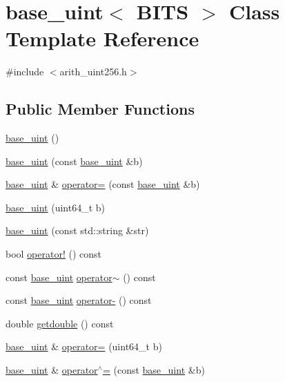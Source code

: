 \hypertarget{classbase__uint}{}\section{base\+\_\+uint$<$ B\+I\+TS $>$ Class Template Reference}
\label{classbase__uint}


{\ttfamily \#include $<$arith\+\_\+uint256.\+h$>$}

\subsection*{Public Member Functions}
\begin{DoxyCompactItemize}
\item 
\mbox{\hyperlink{classbase__uint_aafd4418923a92b58a1c360e657fa7d83}{base\+\_\+uint}} ()
\item 
\mbox{\hyperlink{classbase__uint_a5d4e4c28c82c3a12b3689860081579c1}{base\+\_\+uint}} (const \mbox{\hyperlink{classbase__uint}{base\+\_\+uint}} \&b)
\item 
\mbox{\hyperlink{classbase__uint}{base\+\_\+uint}} \& \mbox{\hyperlink{classbase__uint_a0425a3c4d342b6fc9a68b1766cee9ede}{operator=}} (const \mbox{\hyperlink{classbase__uint}{base\+\_\+uint}} \&b)
\item 
\mbox{\hyperlink{classbase__uint_a217f9750f0ca9cdeefffb7bb1f1952d6}{base\+\_\+uint}} (uint64\+\_\+t b)
\item 
\mbox{\hyperlink{classbase__uint_aa1ebaba47302da3e120879d186355736}{base\+\_\+uint}} (const std\+::string \&str)
\item 
bool \mbox{\hyperlink{classbase__uint_afbcdb1cf849d37272b4e7d4fabf1192b}{operator!}} () const
\item 
const \mbox{\hyperlink{classbase__uint}{base\+\_\+uint}} \mbox{\hyperlink{classbase__uint_a2803d039b33d5570f47ac39d797bc9ea}{operator$\sim$}} () const
\item 
const \mbox{\hyperlink{classbase__uint}{base\+\_\+uint}} \mbox{\hyperlink{classbase__uint_a3b758876b828c6faffdc2a2880122595}{operator-\/}} () const
\item 
double \mbox{\hyperlink{classbase__uint_ac989d44cd0d60e6c510722a714b817fa}{getdouble}} () const
\item 
\mbox{\hyperlink{classbase__uint}{base\+\_\+uint}} \& \mbox{\hyperlink{classbase__uint_a115a5ddb2f2637e09703a25cfc580483}{operator=}} (uint64\+\_\+t b)
\item 
\mbox{\hyperlink{classbase__uint}{base\+\_\+uint}} \& \mbox{\hyperlink{classbase__uint_ad5ec10977ebeab115fe857637990e267}{operator$^\wedge$=}} (const \mbox{\hyperlink{classbase__uint}{base\+\_\+uint}} \&b)

\end{DoxyCompactItemize}
